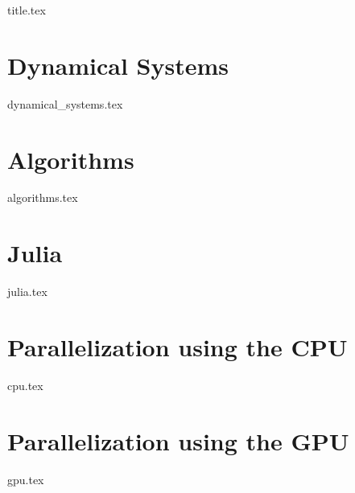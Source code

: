 \documentclass[12pt,a4paper,twoside]{article}
\numberwithin{figure}{section}
\numberwithin{equation}{section}
\theoremstyle{definition}
\theoremstyle{remark}
\theoremstyle{remark}
\begin{document}
{title.tex}

\newpage
\tableofcontents
\newpage

\pagestyle{headings}

\section{Dynamical Systems}
{dynamical_systems.tex}
\section{Algorithms}
{algorithms.tex}
\section{Julia}
{julia.tex}
\section{Parallelization using the CPU}
{cpu.tex}
\section{Parallelization using the GPU}
{gpu.tex}

\printbibliography
\end{document}
